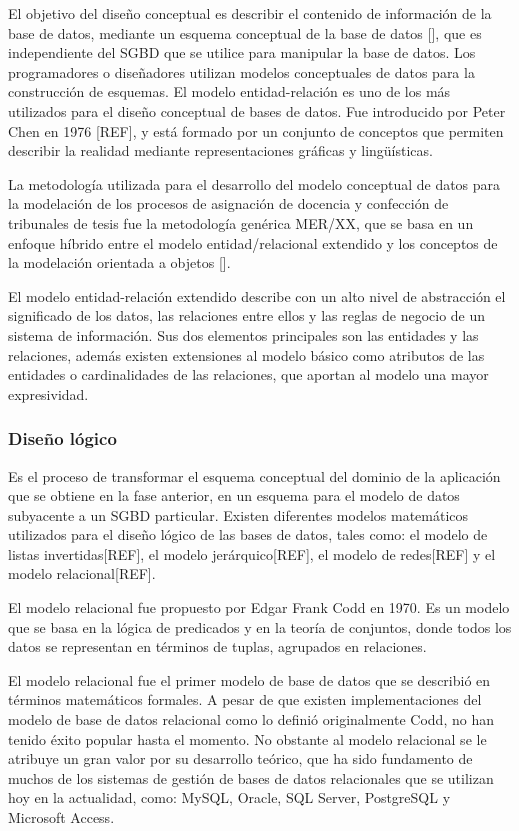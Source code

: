 El objetivo del diseño conceptual es describir el contenido de 
información de la base de datos, mediante un esquema conceptual de
la base de datos [\cite{db_book_cap3}], que es independiente del SGBD
que se utilice para manipular la base de datos.
Los programadores o diseñadores utilizan modelos conceptuales de datos 
para la construcción de esquemas. El modelo entidad-relación es uno 
de los más utilizados para el diseño conceptual de bases de datos. Fue 
introducido por Peter Chen en 1976 [REF], y está formado por 
un conjunto de conceptos que permiten describir la realidad mediante 
representaciones gráficas y lingüísticas.

La metodología utilizada 
para el desarrollo del modelo conceptual de datos para la modelación 
de los procesos de asignación de docencia y confección de tribunales de 
tesis fue la metodología genérica MER/XX, que se basa en un enfoque
híbrido entre el modelo entidad/relacional extendido y los conceptos de la 
modelación orientada a objetos [\cite{db_book_cap2}]. 

El modelo entidad-relación extendido describe con un alto nivel de abstracción
el significado de los datos, las relaciones entre ellos y las reglas de negocio 
de un sistema de información. Sus dos elementos principales son las entidades y 
las relaciones, además existen extensiones al modelo básico 
como atributos de las entidades o cardinalidades de las relaciones, 
que aportan al modelo una mayor expresividad.



\subsubsection{Diseño lógico}
Es el proceso de transformar el esquema conceptual del dominio de la aplicación
que se obtiene en la fase anterior,
en un esquema para el modelo de datos subyacente a un SGBD particular.
Existen diferentes modelos matemáticos utilizados para el diseño lógico
de las bases de datos, tales como: el modelo de listas invertidas[REF], el modelo 
jerárquico[REF], el modelo de redes[REF] y el modelo relacional[REF]. 

El modelo relacional fue propuesto por Edgar Frank Codd en 1970. Es un 
modelo que se basa en la lógica de predicados y en la teoría 
de conjuntos, donde todos los datos se representan en términos de tuplas, 
agrupados en relaciones.

El modelo relacional fue el primer modelo de base de datos que se describió en términos 
matemáticos formales. A pesar de que existen  
implementaciones del modelo de base de datos relacional como lo definió originalmente 
Codd, no han tenido éxito popular hasta el momento. No obstante al modelo relacional se le 
atribuye un gran valor por su desarrollo teórico, que ha sido fundamento de muchos de los 
sistemas de gestión de bases de datos relacionales que se utilizan hoy en la actualidad, como:
MySQL, Oracle, SQL Server, PostgreSQL y Microsoft Access. 

